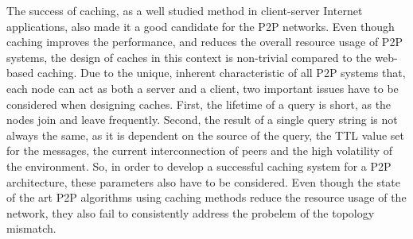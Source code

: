The success of caching, as a well studied method in client-server Internet
applications, also made it a good candidate for the P2P networks. Even
though caching improves the performance, and reduces the overall resource usage
of P2P systems, the design of caches in this context is non-trivial compared to
the web-based caching. Due to the unique, inherent characteristic of all P2P
systems that, each node can act as both a server and a client, two important
issues have to be considered when designing caches. First, the lifetime of a
query is short, as the nodes join and leave frequently. Second, the result of a
single query string is not always the same, as it is dependent on the source of
the query, the TTL value set for the messages, the current interconnection of
peers and the high volatility of the environment. So, in order to develop a
successful caching system for a P2P architecture, these parameters also have to
be considered. Even though the state of the art P2P algorithms using caching
methods reduce the resource usage of the network, they also fail to consistently
address the probelem of the topology mismatch.

